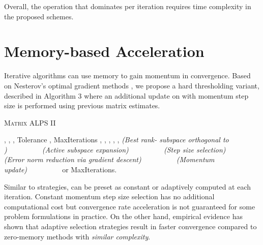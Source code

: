 \documentclass[twocolumn]{svjour3}
\begin{document}
Overall, the operation that dominates per iteration requires  time complexity in the proposed schemes. 

\section{Memory-based Acceleration}{\label{sec:memory}}
Iterative algorithms can use memory to gain momentum in convergence. Based on Nesterov's optimal gradient methods \cite{nesterov2007gradient}, we propose a hard thresholding variant, described in Algorithm 3 where an additional update on  with momentum step size  is performed using previous matrix estimates.

\begin{algorithm*}[th!]
   \caption{\textsc{Matrix ALPS II}}\label{algo: class}
\begin{algorithmic}[1]
    , , , Tolerance , MaxIterations
    , , , , , 
    \State \hspace{0.16cm}  \hspace*{\fill}\textit{(Best rank- subspace orthogonal to )~~~~~~~~~}
   \State \hspace{0.16cm}  \hspace*{\fill}\textit{(Active subspace expansion)~~~~~~~~~}
   \State \hspace{0.16cm}  \hspace*{\fill} \textit{(Step size selection)~~~~~~~~~}
   \State \hspace{0.16cm}  \hspace*{\fill} \textit{(Error norm reduction via gradient descent)~~~~~~~~~}
   \State \hspace{0.16cm}  
   \State \hspace{0.16cm}  \hspace*{\fill}\textit{(Momentum update)~~~~~~~~~}
   \State \hspace{0.16cm} 
   \Statex \hspace{0.16cm} 
     or MaxIterations.
\end{algorithmic}
\end{algorithm*}

Similar to  strategies,  can be preset as constant or adaptively computed at each iteration. Constant momentum step size selection has no additional computational cost but convergence rate acceleration is not guaranteed for some problem formulations in practice. On the other hand, empirical evidence has shown that adaptive  selection strategies result in faster convergence compared to zero-memory methods with {\it similar complexity}. 
\end{document}
